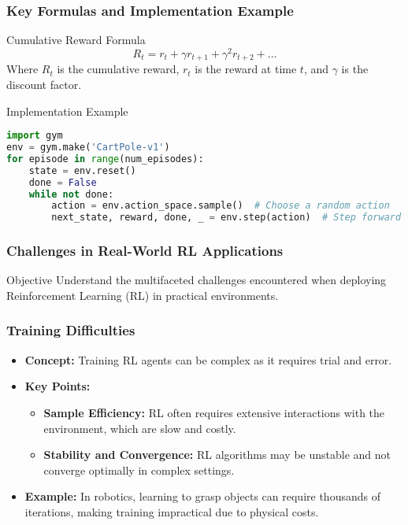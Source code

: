 \documentclass[aspectratio=169]{beamer}
\begin{document}
\begin{frame}[fragile]
    \frametitle{Key Formulas and Implementation Example}
    \begin{block}{Cumulative Reward Formula}
        \begin{equation}
            R_t = r_t + \gamma r_{t+1} + \gamma^2 r_{t+2} + \ldots
        \end{equation}
        Where \( R_t \) is the cumulative reward, \( r_t \) is the reward at time \( t \), and \( \gamma \) is the discount factor.
    \end{block}

    \begin{block}{Implementation Example}
        \begin{lstlisting}[language=Python]
import gym
env = gym.make('CartPole-v1')
for episode in range(num_episodes):
    state = env.reset()
    done = False
    while not done:
        action = env.action_space.sample()  # Choose a random action
        next_state, reward, done, _ = env.step(action)  # Step forward in the environment
        \end{lstlisting}
    \end{block}
\end{frame}

\begin{frame}[fragile]
    \frametitle{Challenges in Real-World RL Applications}
    \begin{block}{Objective}
        Understand the multifaceted challenges encountered when deploying Reinforcement Learning (RL) in practical environments.
    \end{block}
\end{frame}

\begin{frame}[fragile]
    \frametitle{Training Difficulties}
    \begin{itemize}
        \item \textbf{Concept:} Training RL agents can be complex as it requires trial and error.
        \item \textbf{Key Points:}
        \begin{itemize}
            \item \textbf{Sample Efficiency:} RL often requires extensive interactions with the environment, which are slow and costly.
            \item \textbf{Stability and Convergence:} RL algorithms may be unstable and not converge optimally in complex settings.
        \end{itemize}
        \item \textbf{Example:} In robotics, learning to grasp objects can require thousands of iterations, making training impractical due to physical costs.
    \end{itemize}
\end{frame}
\end{document}
